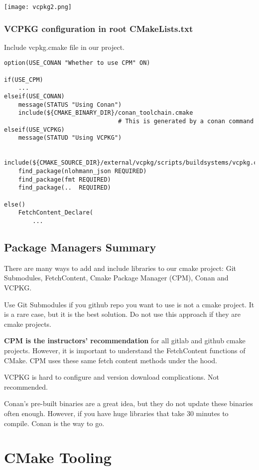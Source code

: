 \documentclass[openany]{report}
\begin{document}
\begin{center}
    \texttt{[image: vcpkg2.png]}
\end{center}


\subsection{VCPKG configuration in root CMakeLists.txt}

Include vcpkg.cmake file in our project.

\begin{verbatim}
option(USE_CONAN "Whether to use CPM" ON)

if(USE_CPM)
    ...
elseif(USE_CONAN)
    message(STATUS "Using Conan")
    include(${CMAKE_BINARY_DIR}/conan_toolchain.cmake  
                                # This is generated by a conan command
elseif(USE_VCPKG)
    message(STATUD "Using VCPKG")

    include(${CMAKE_SOURCE_DIR}/external/vcpkg/scripts/buildsystems/vcpkg.cmake)
    find_package(nlohmann_json REQUIRED)
    find_package(fmt REQUIRED)
    find_package(..  REQUIRED)

else()
    FetchContent_Declare(
        ...
\end{verbatim}

\section{Package Managers Summary}

There are many ways to add and include libraries to our cmake project: Git Submodules, FetchContent,
Cmake Package Manager (CPM), Conan and VCPKG.

Use Git Submodules if you github repo you want to use is not a cmake project. It is a rare case, but it is
the best solution. Do not use this approach if they are cmake projects.


\textbf{CPM is the instructors' recommendation} for all gitlab and github cmake projects. However, it is important to understand the FetchContent functions of 
CMake. CPM uses these same fetch content methods under the hood.


VCPKG is hard to configure and version download complications. Not recommended.

Conan's pre-built binaries are a great idea, but they do not update these binaries often enough. 
However, if you have huge libraries that take 30 minutes to compile. Conan is the way to go.

\chapter{CMake Tooling}
\end{document}
